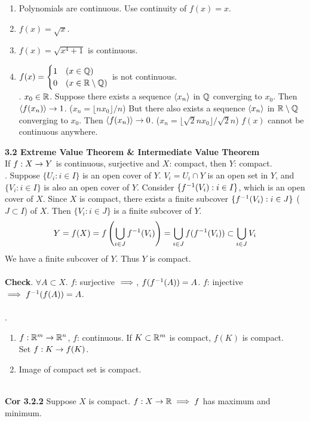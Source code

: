 \begin{enumerate}
	\item Polynomials are continuous. Use continuity of $f(x)=x$.
	\item $f(x) = \sqrt{x}$.
	\item $f(x) = \sqrt{x^4+1}$ is continuous.
	\item $f(x) = \begin{cases}
		1 & (x\in \mathbb{Q})\\
		0 & (x\in \mathbb{R}\setminus\mathbb{Q})
	\end{cases}$ is not continuous.\\
	\pf. $x_0\in \mathbb{R}$. Suppose there exists a sequence $\left\langle x_n \right\rangle$ in $\mathbb{Q}$ converging to $x_0$. Then $\left\langle f(x_n) \right\rangle\rightarrow 1$. ($x_n = \lfloor nx_0 \rfloor / n$) But there also exists a sequence $\left\langle x_n \right\rangle$ in $\mathbb{R}\setminus\mathbb{Q}$ converging to $x_0$. Then $\left\langle f(x_n) \right\rangle \rightarrow 0$. ($x_n = \lfloor \sqrt{2}nx_0\rfloor / \sqrt{2}n$) $f(x)$ cannot be continuous anywhere.
\end{enumerate}
\textbf{3.2 Extreme Value Theorem \& Intermediate Value Theorem}\\
 If $f:X\rightarrow Y$ is continuous, surjective and $X$: compact, then $Y$: compact.\\
\pf. Suppose $\{U_i: i\in I\}$ is an open cover of $Y$. $V_i = U_i \cap Y$ is an open set in $Y$, and $\{V_i: i\in I\}$ is also an open cover of $Y$. Consider $\{f^{-1} (V_i):i\in I \}$, which is an open cover of $X$. Since $X$ is compact, there exists a finite subcover $\{f^{-1}(V_i): i \in J\}$ ($J\subset I$) of $X$. Then $\{V_i: i\in J\}$ is a finite subcover of $Y$. $$Y = f(X) = f\left(\bigcup_{i\in J} f^{-1}(V_i)\right) = \bigcup_{i\in J} f(f^{-1}(V_i)) \subset \bigcup_{i\in J} V_i$$
We have a finite subcover of $Y$. Thus $Y$ is compact.\\
\\
\textbf{Check}. $\forall A\subset X$. $f$: surjective $\implies $, $f(f^{-1}(A)) = A$. $f$: injective $\implies f^{-1}(f(A)) = A$.\\
\\
\rmk.
\begin{enumerate}
	\item $f: \mathbb{R}^m\rightarrow \mathbb{R}^n$, $f$: continuous. If $K\subset \mathbb{R}^m$ is compact, $f(K)$ is compact.\\
	Set $f: K\rightarrow f(K)$.
	\item Image of compact set is compact.
\end{enumerate}~\\
\textbf{Cor 3.2.2} Suppose $X$ is compact. $f:X\rightarrow \mathbb{R} \implies f$ has maximum and minimum.\\
